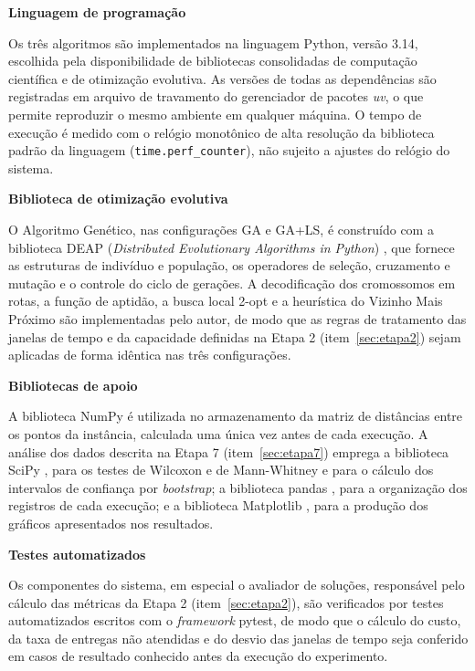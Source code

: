 \begin{alineas}
	\item \textbf{Linguagem de programação}

	Os três algoritmos são implementados na linguagem Python, versão 3.14, escolhida pela
	disponibilidade de bibliotecas consolidadas de computação científica e de otimização
	evolutiva. As versões de todas as dependências são registradas em arquivo de
	travamento do gerenciador de pacotes \textit{uv}, o que permite reproduzir o mesmo
	ambiente em qualquer máquina. O tempo de execução é medido com o relógio monotônico de
	alta resolução da biblioteca padrão da linguagem (\texttt{time.perf\_counter}), não
	sujeito a ajustes do relógio do sistema.

	\item \textbf{Biblioteca de otimização evolutiva}

	O Algoritmo Genético, nas configurações GA e GA+LS, é construído com a biblioteca DEAP
	(\textit{Distributed Evolutionary Algorithms in Python}) \cite{fortin2012}, que
	fornece as estruturas de indivíduo e população, os operadores de seleção, cruzamento e
	mutação e o controle do ciclo de gerações. A decodificação dos cromossomos em rotas, a
	função de aptidão, a busca local 2-opt e a heurística do Vizinho Mais Próximo são
	implementadas pelo autor, de modo que as regras de tratamento das janelas de tempo
	e da capacidade definidas na Etapa 2 (item~\ref{sec:etapa2}) sejam aplicadas de forma
	idêntica nas três configurações.

	\item \textbf{Bibliotecas de apoio}

	A biblioteca NumPy \cite{harris2020} é utilizada no armazenamento da matriz de
	distâncias entre os pontos da instância, calculada uma única vez antes de cada
	execução. A análise dos dados descrita na Etapa 7 (item~\ref{sec:etapa7}) emprega a
	biblioteca SciPy \cite{virtanen2020}, para os testes de Wilcoxon e de Mann-Whitney e
	para o cálculo dos intervalos de confiança por \textit{bootstrap}; a biblioteca pandas
	\cite{mckinney2010}, para a organização dos registros de cada execução; e a biblioteca
	Matplotlib \cite{hunter2007}, para a produção dos gráficos apresentados nos
	resultados.

	\item \textbf{Testes automatizados}

	Os componentes do sistema, em especial o avaliador de soluções, responsável pelo
	cálculo das métricas da Etapa 2 (item~\ref{sec:etapa2}), são verificados por testes
	automatizados escritos com o \textit{framework} pytest, de modo que o cálculo do custo,
	da taxa de entregas não atendidas e do desvio das janelas de tempo seja conferido em
	casos de resultado conhecido antes da execução do experimento.


\end{alineas}
